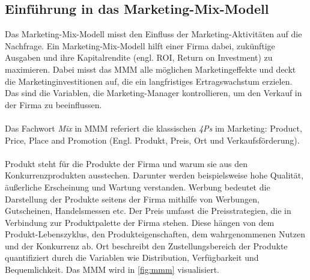\subsection{Einführung in das Marketing-Mix-Modell}
\label{EinführungInDasMMM}
Das Marketing-Mix-Modell misst den Einfluss der Marketing-Aktivitäten auf die Nachfrage. Ein Marketing-Mix-Modell hilft einer Firma dabei, zukünftige Ausgaben und ihre Kapitalrendite (engl. \ac{ROI}, Return on Investment) zu maximieren. Dabei misst das \ac{MMM} alle möglichen Marketingeffekte und deckt die Marketinginvestitionen auf, die ein langfristiges Ertragswachstum erzielen. Das sind die Variablen, die Marketing-Manager kontrollieren, um den Verkauf in der Firma zu beeinflussen. \\\\Das Fachwort \textit{Mix} in \ac{MMM} referiert die klassischen \textit{4Ps} im Marketing: Product, Price, Place and Promotion (Engl. Produkt, Preis, Ort und Verkaufsförderung)\cite[S. 109 ff]{akinkunmi2018data}. \\\\
Produkt steht für die Produkte der Firma und warum sie aus den Konkurrenzprodukten ausstechen. Darunter werden beispielsweise hohe Qualität, äußerliche Erscheinung und Wartung verstanden. Werbung bedeutet die Darstellung der Produkte seitens der Firma mithilfe von Werbungen, Gutscheinen, Handelsmessen etc. Der Preis umfasst die Preisstrategien, die in Verbindung zur Produktpalette der Firma stehen. Diese hängen von dem Produkt-Lebenszyklus, den Produkteigenschaften, dem wahrgenommenen Nutzen und der Konkurrenz ab. Ort beschreibt den Zustellungsbereich der Produkte quantifiziert durch die Variablen wie Distribution, Verfügbarkeit und Bequemlichkeit\cite{akinkunmi2018data}. Das \ac{MMM} wird in \autoref{fig:mmm} visualisiert. \\\\ 

